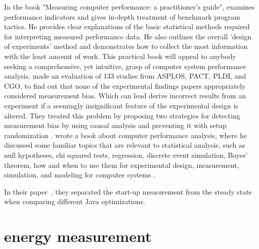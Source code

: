In the book "Measuring computer performance: a practitioner's guide"\cite{lilja2005measuring},\citeauthor{lilja2005measuring} examines performance indicators and gives in-depth treatment of benchmark program tactics. He provides clear explanations of the basic statistical methods required for interpreting measured performance data. He also outlines the overall 'design of experiments' method and demonstrates how to collect the most information with the least amount of work. This practical book will appeal to anybody seeking a comprehensive, yet intuitive, grasp of computer system performance analysis.
\citeauthor{mytkowicz2009producing} made an evaluation  of 133 studies from ASPLOS, PACT, PLDI, and CGO, to find out that none of the experimental findings papers appropriately considered measurement bias. Which can lead derive incorrect results from an experiment if a seemingly insignificant feature of the experimental design is altered. They treated this problem by proposing two strategies for detecting measurement bias by using causal analysis and preventing it with setup randomization \cite{mytkowicz2009producing}.
\citeauthor{bukh1992art} wrote a book about computer performance analysis, where he discussed some familiar topics that are relevant to statistical analysis, such as null hypotheses, chi squared tests, regression, discrete event simulation, Bayes' theorem, how and when to use them for experimental design, measurement, simulation, and modeling for computer systems .






In their paper~\cite{buytaert_statistically_nodate},\citeauthor{buytaert_statistically_nodate} they separated the start-up measurement from the steady state when comparing different Java optimizations.
\\
\section{energy measurement}\label{sec:energymeasurement}



